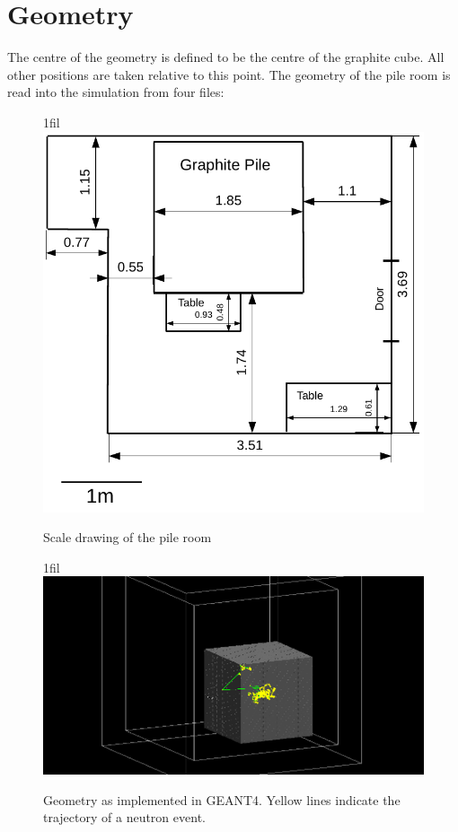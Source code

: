 \documentclass{article}
\makeatletter
\newcommand*{\centerfloat}{%
  \parindent \z@
  \leftskip \z@ \@plus 1fil \@minus \textwidth
  \rightskip\leftskip
  \parfillskip \z@skip}
\makeatother
\begin{document}
\section{Geometry}

	The centre of the geometry is defined to be the centre of the graphite cube. All other positions are taken relative to this point. The geometry of the pile room is read into the simulation from four files:

\begin{figure}
	\centerfloat
	\includegraphics[width=\columnwidth]{images/Room}
	\caption{Scale drawing of the pile room}	
	\label{fig:room}
\end{figure}


\begin{figure}
	\centerfloat
	\includegraphics[width=\columnwidth]{images/10Events}
	\caption{Geometry as implemented in GEANT4. Yellow lines indicate the trajectory of a neutron event.}	
	\label{fig:tenEvents}
\end{figure}
\end{document}
